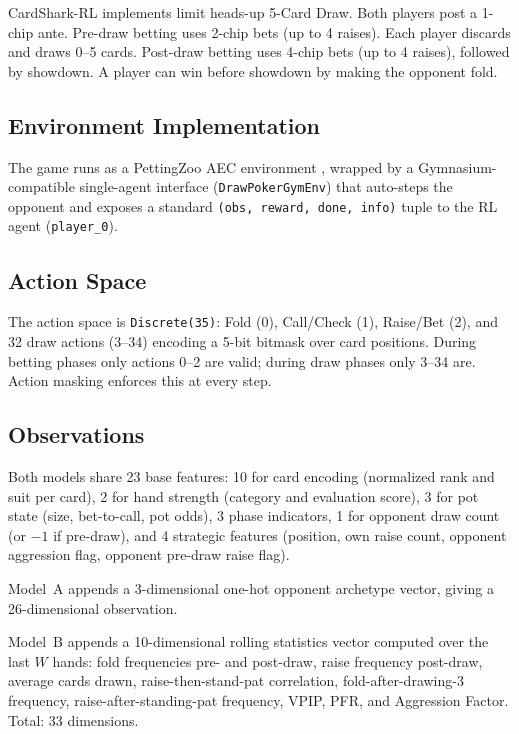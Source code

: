 \documentclass[11pt, conference]{IEEEtran}
\begin{document}
CardShark-RL implements limit heads-up 5-Card Draw. Both players post
a 1-chip ante. Pre-draw betting uses 2-chip bets (up to 4 raises).
Each player discards and draws 0--5 cards. Post-draw betting uses
4-chip bets (up to 4 raises), followed by showdown. A player can win
before showdown by making the opponent fold.

\subsection{Environment Implementation}

The game runs as a PettingZoo AEC environment \cite{terry2021pettingzoo},
wrapped by a Gymnasium-compatible \cite{brockman2016openai} single-agent
interface (\texttt{DrawPokerGymEnv}) that auto-steps the opponent and
exposes a standard \texttt{(obs, reward, done, info)} tuple to the RL
agent (\texttt{player\_0}).

\subsection{Action Space}

The action space is \texttt{Discrete(35)}: Fold (0), Call/Check (1),
Raise/Bet (2), and 32 draw actions (3--34) encoding a 5-bit bitmask
over card positions. During betting phases only actions 0--2 are valid;
during draw phases only 3--34 are. Action masking enforces this at
every step.

\subsection{Observations}

Both models share 23 base features: 10 for card encoding (normalized
rank and suit per card), 2 for hand strength (category and evaluation
score), 3 for pot state (size, bet-to-call, pot odds), 3 phase
indicators, 1 for opponent draw count (or $-1$ if pre-draw), and 4
strategic features (position, own raise count, opponent aggression flag,
opponent pre-draw raise flag).

Model~A appends a 3-dimensional one-hot opponent archetype vector,
giving a 26-dimensional observation.

Model~B appends a 10-dimensional rolling statistics vector computed
over the last $W$ hands: fold frequencies pre- and post-draw, raise
frequency post-draw, average cards drawn, raise-then-stand-pat
correlation, fold-after-drawing-3 frequency, raise-after-standing-pat
frequency, VPIP, PFR, and Aggression Factor. Total: 33 dimensions.
\end{document}
